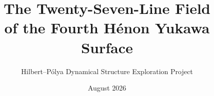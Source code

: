 \documentclass[11pt]{article}
\title{The Twenty-Seven-Line Field\\
of the Fourth H\'enon Yukawa Surface}
\author{Hilbert--P\'olya Dynamical Structure Exploration Project}
\date{August 2026}
\theoremstyle{definition}
\theoremstyle{remark}
\begin{document}
\maketitle











\appendix




\begingroup
\raggedright


\endgroup
\end{document}
